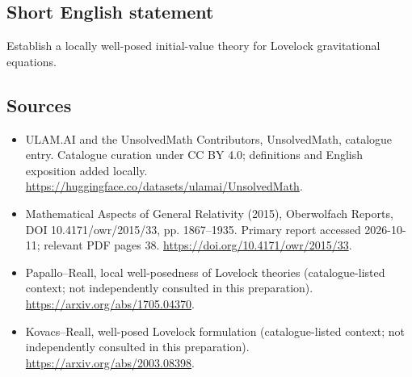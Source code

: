 \documentclass[11pt]{article}
\begin{document}
\subsection{Short English statement}
Establish a locally well-posed initial-value theory for Lovelock gravitational equations.
\subsection{Sources}
\begin{itemize}
\item[\hypertarget{source:statement:1}{S1}] ULAM.AI and the UnsolvedMath Contributors, UnsolvedMath, catalogue entry. Catalogue curation under CC BY 4.0; definitions and English exposition added locally.
\url{https://huggingface.co/datasets/ulamai/UnsolvedMath}.
\item[\hypertarget{source:statement:2}{S2}] Mathematical Aspects of General Relativity (2015), Oberwolfach Reports, DOI 10.4171/owr/2015/33, pp. 1867--1935. Primary report accessed 2026-10-11; relevant PDF pages 38.
\url{https://doi.org/10.4171/owr/2015/33}.
\item[\hypertarget{source:statement:3}{S3}] Papallo--Reall, local well-posedness of Lovelock theories (catalogue-listed context; not independently consulted in this preparation).
\url{https://arxiv.org/abs/1705.04370}.
\item[\hypertarget{source:statement:4}{S4}] Kovacs--Reall, well-posed Lovelock formulation (catalogue-listed context; not independently consulted in this preparation).
\url{https://arxiv.org/abs/2003.08398}.
\end{itemize}
\label{end:statement}
\end{document}
